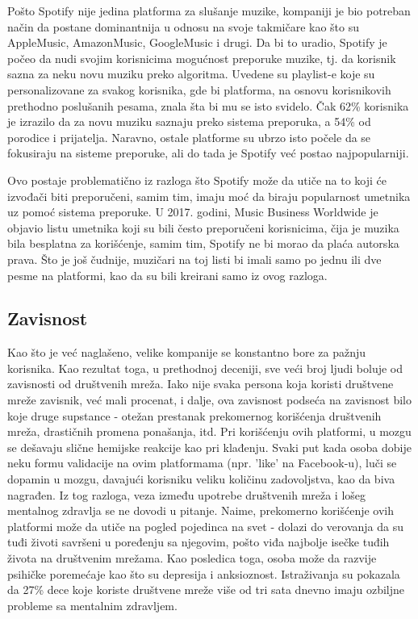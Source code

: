 \documentclass[a4paper]{article}
\begin{document}
Pošto Spotify nije jedina platforma za slušanje muzike, kompaniji je bio potreban način da postane dominantnija u odnosu na svoje takmičare kao što su AppleMusic, AmazonMusic, GoogleMusic i drugi. Da bi to uradio, Spotify je počeo da nudi svojim korisnicima mogućnost preporuke muzike, tj. da korisnik sazna za neku novu muziku preko algoritma. Uvedene su playlist-e koje su personalizovane za svakog korisnika, gde bi platforma, na osnovu korisnikovih prethodno poslušanih pesama, znala šta bi mu se isto svidelo. 
Čak 62\% korisnika je izrazilo da za novu muziku saznaju preko sistema preporuka, a 54\% od porodice i prijatelja. Naravno, ostale platforme su ubrzo isto počele da se fokusiraju na sisteme preporuke, ali do tada je Spotify već postao najpopularniji. 

Ovo postaje problematično iz razloga što Spotify može da utiče na to koji će izvođači biti preporučeni, samim tim, imaju moć da biraju popularnost umetnika uz pomoć sistema preporuke. U 2017. godini, Music Business Worldwide je objavio listu umetnika koji su bili često preporučeni korisnicima, čija je muzika bila besplatna za korišćenje, samim tim, Spotify ne bi morao da plaća autorska prava. Što je još čudnije, muzičari na toj listi bi imali samo po jednu ili dve pesme na platformi, kao da su bili kreirani samo iz ovog razloga. \cite{spotify}

 

\subsection{Zavisnost}
Kao što je već naglašeno, velike kompanije se konstantno bore za pažnju korisnika. Kao rezultat toga, u prethodnoj deceniji, sve veći broj ljudi boluje od zavisnosti od društvenih mreža. Iako nije svaka persona koja koristi društvene mreže zavisnik, već mali procenat, i dalje, ova zavisnost podseća na zavisnost bilo koje druge supstance - otežan prestanak prekomernog korišćenja društvenih mreža, drastičnih promena ponašanja, itd. Pri korišćenju ovih platformi, u mozgu se dešavaju slične hemijske reakcije kao pri klađenju. \cite{zavisnost} Svaki put kada osoba dobije neku formu validacije na ovim platformama (npr. 'like' na Facebook-u), luči se dopamin u mozgu, davajući korisniku veliku količinu zadovoljstva, kao da biva nagrađen. Iz tog razloga, veza između upotrebe društvenih mreža i lošeg mentalnog zdravlja se ne dovodi u pitanje. Naime, prekomerno korišćenje ovih platformi može da utiče na pogled pojedinca na svet - dolazi do verovanja da su tuđi životi savršeni u poređenju sa njegovim, pošto viđa najbolje isečke tuđih života na društvenim mrežama. Kao posledica toga, osoba može da razvije psihičke poremećaje kao što su depresija i anksioznost. Istraživanja su pokazala da 27\% dece koje koriste društvene mreže više od tri sata dnevno imaju ozbiljne probleme sa mentalnim zdravljem.
\end{document}
